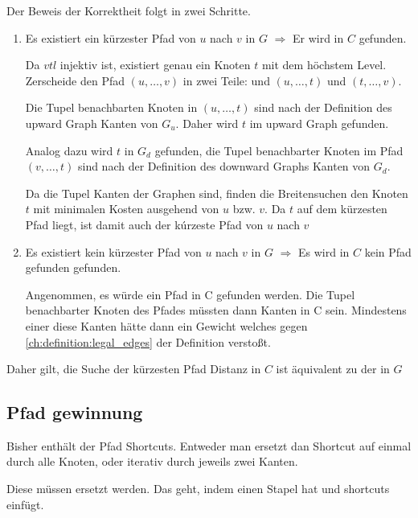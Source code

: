 \begin{beweis}
    Der Beweis der Korrektheit folgt in zwei Schritte.

    \begin{enumerate}
        \item
              Es existiert ein kürzester Pfad von $u$ nach $v$ in $G$ $\Rightarrow$ Er wird in $C$ gefunden.

              Da ${vtl}$ injektiv ist, existiert genau ein Knoten $t$ mit dem höchstem Level. Zerscheide den Pfad $(u, \dotsc, v)$ in zwei Teile:  und $(u, \dotsc, t)$ und $(t, \dotsc, v)$.

              Die Tupel benachbarten Knoten in $(u, \dotsc, t)$ sind nach der Definition des upward Graph Kanten von $G_u$. Daher wird $t$ im upward Graph gefunden.

              Analog dazu wird $t$ in $G_d$ gefunden, die Tupel benachbarter Knoten im Pfad $(v, \dotsc, t)$ sind nach der Definition des downward Graphs Kanten von $G_d$.

              Da die Tupel Kanten der Graphen sind, finden die Breitensuchen den Knoten $t$ mit minimalen Kosten ausgehend von $u$ bzw. $v$. Da $t$ auf dem kürzesten Pfad liegt, ist damit auch der kúrzeste Pfad von $u$ nach $v$

        \item
              Es existiert kein kürzester Pfad von $u$ nach $v$ in $G$ $\Rightarrow$ Es wird in $C$ kein Pfad gefunden gefunden.

              Angenommen, es würde ein Pfad in C gefunden werden. Die Tupel benachbarter Knoten des Pfades müssten dann Kanten in C sein.
              Mindestens einer diese Kanten hätte dann ein Gewicht welches gegen \autoref{ch:definition:legal_edges} der Definition verstoßt.
    \end{enumerate}

    Daher gilt, die Suche der kürzesten Pfad Distanz in $C$ ist äquivalent zu der in $G$
\end{beweis}

\subsection{Pfad gewinnung}
Bisher enthält der Pfad Shortcuts.
Entweder man ersetzt dan Shortcut auf einmal durch alle Knoten, oder iterativ durch jeweils zwei Kanten.

Diese müssen ersetzt werden.
Das geht, indem einen Stapel hat und shortcuts einfügt.

